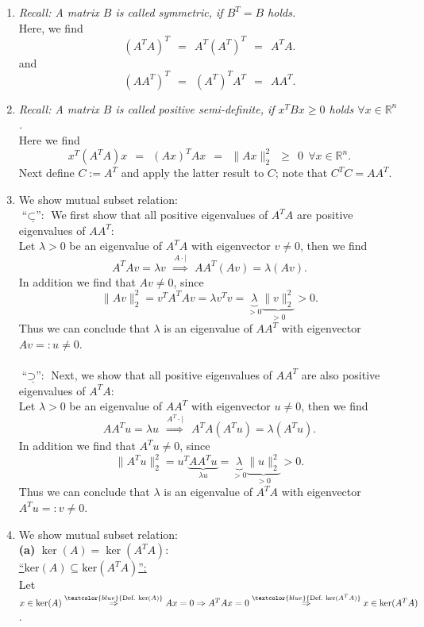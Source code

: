 {
\color{solution}
\begin{enumerate}
	\item 
	\textit{Recall: A matrix $B$ is called symmetric, if $B^T=B$ holds.}\\
	Here, we find
	$$(A^TA)^T \ \ =\ \ A^T(A^T)^T\ \ =\ \ A^TA.$$
	and
	$$(AA^T)^T \ \ =\ \ (A^T)^TA^T\ \ =\ \ AA^T.$$
	\item 
	\textit{Recall: A matrix $B$ is called positive semi-definite, if $x^TBx\geq 0$ holds $\forall x\in\mathbb{R}^n$.}\\
	Here we find
	$$x^T(A^TA)x\ \ =\ \ (Ax)^TAx\ \ =\ \ \|{Ax}\|_2^2\ \ \geq\ \ 0\ \ \forall x\in\mathbb{R}^n.$$
Next define $C:=A^T$ and apply the latter result to $C$; note that $C^TC = AA^T$.
	\item We show mutual subset relation:\\
	$\underline{\textbf{``$\subset$'':}}$ We first show that all positive eigenvalues of $A^TA$ are positive eigenvalues of $AA^T$:\\
		Let $\lambda>0$ be an eigenvalue of $A^TA$ with eigenvector $v\neq 0$, then we find
		$$A^TAv=\lambda v~~\stackrel{A\cdot|}{\Rightarrow}~~AA^T(Av)=\lambda(Av).$$
		In addition we find that $Av \neq 0$, since 
		$$\|Av\|_2^2 = v^TA^TAv = \lambda v^Tv = \underbrace{\lambda}_{>0}\underbrace{\|v\|_2^2}_{>0} >0.$$
		Thus we can conclude that $\lambda$ is an eigenvalue of $AA^T$ with eigenvector $Av=:u\neq 0$.\\~\\
	$\underline{\textbf{``$\supset$'':}}$ Next, we show that all positive eigenvalues of $AA^T$ are also positive eigenvalues of $A^TA$:\\
		Let $\lambda>0$ be an eigenvalue of $AA^T$ with eigenvector $u\neq 0$, then we find
		$$AA^Tu=\lambda u~~\stackrel{A^T\cdot|}{\Rightarrow}~~A^TA(A^Tu)=\lambda(A^Tu).$$
		In addition we find that $A^Tu \neq 0$, since 
		$$\|A^Tu\|_2^2 = u^T\underbrace{AA^Tu}_{\lambda u} = \underbrace{\lambda}_{>0}\underbrace{\|u\|_2^2}_{>0} >0.$$
		Thus we can conclude that $\lambda$ is an eigenvalue of $A^TA$ with eigenvector $A^Tu=:v\neq 0$.
	\item 
	We show mutual subset relation:\\
	\textbf{(a)} $\ker(A) = \ker(A^TA)$:\\[0.2cm]
		\underline{``$\text{ker}(A)\subseteq \text{ker}(A^TA)$'':}\\
		Let $x\in \text{ker}(A) \stackrel{\textcolor{blue}{\text{Def.}\ \text{ker}(A)}}{\Rightarrow}Ax=0\Rightarrow A^TAx=0\stackrel{\textcolor{blue}{\text{Def.}\ \text{ker}(A^TA)}}{\Rightarrow}x\in \text{ker}(A^TA)$.\\~\\

\end{enumerate}}
